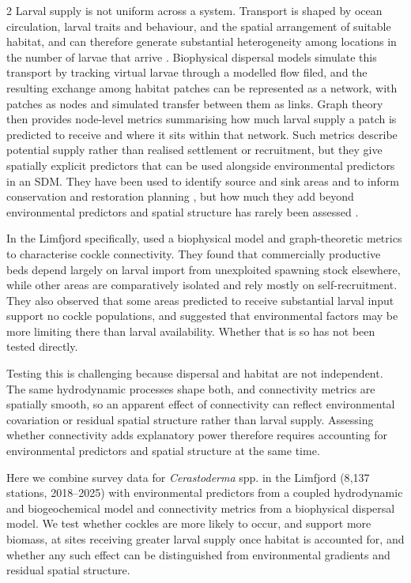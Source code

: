 \begin{spacing}{2}
Larval supply is not uniform across a system. Transport is shaped by ocean circulation, larval traits and behaviour, and the spatial arrangement of suitable habitat, and can therefore generate substantial heterogeneity among locations in the number of larvae that arrive \citep{cowenLarvalDispersalMarine2009,
siegelStochasticNatureLarval2008}. Biophysical dispersal models simulate this transport by tracking virtual larvae through a modelled flow filed, and the resulting exchange among habitat patches can be represented as a network, with patches as nodes and simulated transfer between them as links. Graph theory then provides node-level metrics summarising how much larval supply a patch is predicted to receive and where it sits within that network. Such metrics describe potential supply rather than realised settlement or recruitment, but they give spatially explicit predictors that can be used alongside environmental predictors in an SDM. They have been used to identify source and sink areas and to inform conservation and restoration planning
\citep{hansenAssessingDemographicConnectivity2024,
griecoDesigningDispersalConnectivityinformed2026}, but how much they add beyond environmental predictors and spatial structure has rarely been assessed \citep[but see][]{cecinoTestingInfluenceSeascape2021}.

In the Limfjord specifically, \citet{hansenAssessingDemographicConnectivity2024} used a biophysical model and graph-theoretic metrics to characterise cockle connectivity. They found that commercially productive beds depend largely on larval
import from unexploited spawning stock elsewhere, while other areas are comparatively isolated and rely mostly on self-recruitment. They also observed that some areas predicted to receive substantial larval input support no cockle populations, and suggested that environmental factors may be more limiting there than larval availability. Whether that is so has not been tested directly.

Testing this is challenging because dispersal and habitat are not independent. The same hydrodynamic processes shape both, and connectivity metrics are spatially smooth, so an apparent effect of connectivity can reflect environmental covariation or residual spatial structure rather than larval supply. Assessing whether connectivity
adds explanatory power therefore requires accounting for environmental predictors and spatial structure at the same time.

Here we combine survey data for \textit{Cerastoderma} spp. in the Limfjord (8{,}137 stations, 2018--2025) with environmental predictors from a coupled hydrodynamic and biogeochemical model and connectivity metrics from a biophysical dispersal model. We test whether cockles are more likely to occur, and support more biomass, at sites receiving greater larval supply once habitat is accounted for, and whether any such effect can be distinguished from environmental gradients and residual spatial structure.



\end{spacing}
